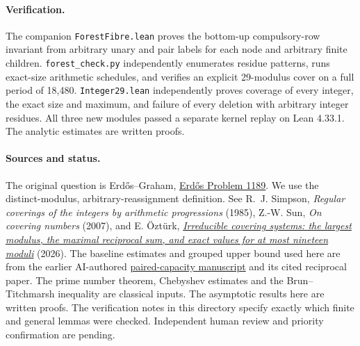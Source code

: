 \documentclass[11pt]{article}
\begin{document}
\paragraph{Verification.} The companion \texttt{ForestFibre.lean} proves the bottom-up compulsory-row invariant from arbitrary unary and pair labels for each node and arbitrary finite children. \texttt{forest\_check.py} independently enumerates residue patterns, runs exact-size arithmetic schedules, and verifies an explicit 29-modulus cover on a full period of 18,480. \texttt{Integer29.lean} independently proves coverage of every integer, the exact size and maximum, and failure of every deletion with arbitrary integer residues. All three new modules passed a separate kernel replay on Lean 4.33.1. The analytic estimates are written proofs.

\paragraph{Sources and status.}
The original question is Erd\H os--Graham, \href{https://www.erdosproblems.com/1189}{Erd\H os Problem 1189}. We use the distinct-modulus, arbitrary-reassignment definition. See R.~J. Simpson, \emph{Regular coverings of the integers by arithmetic progressions} (1985), Z.-W. Sun, \emph{On covering numbers} (2007), and E. \"Ozt\"urk, \href{https://www.researchgate.net/publication/413884122}{\emph{Irreducible covering systems: the largest modulus, the maximal reciprocal sum, and exact values for at most nineteen moduli}} (2026). The baseline estimates and grouped upper bound used here are from the earlier AI-authored \href{https://github.com/jpollard-cs/open-math-agents/blob/ab0f3109122c689eed2e0723f74ed8232d74318b/research/proof-manuscripts/covering-systems/paired-capacity/paired-cap.pdf}{paired-capacity manuscript} and its cited reciprocal paper. The prime number theorem, Chebyshev estimates and the Brun--Titchmarsh inequality are classical inputs. The asymptotic results here are written proofs. The verification notes in this directory specify exactly which finite and general lemmas were checked. Independent human review and priority confirmation are pending.
\end{document}
